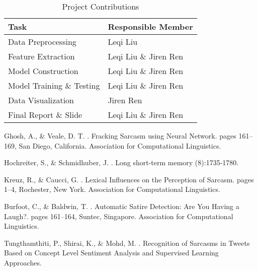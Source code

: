 \documentclass[11pt]{article}
\begin{document}
\begin{table}[ht]
\centering
\begin{tabular}{|l|l|}
\hline
\textbf{Task}              & \textbf{Responsible Member} \\ \hline
Data Preprocessing         & Leqi Liu                    \\ \hline
Feature Extraction         & Leqi Liu \& Jiren Ren       \\ \hline
Model Construction         & Leqi Liu \& Jiren Ren       \\ \hline
Model Training \& Testing  & Leqi Liu \& Jiren Ren       \\ \hline
Data Visualization         & Jiren Ren                   \\ \hline
Final Report \& Slide      & Leqi Liu \& Jiren Ren       \\ \hline
\end{tabular}
\caption{Project Contributions}
\end{table}


%
%

\begin{thebibliography}{}

Ghosh, A., \& Veale, D. T.
.
\newblock Fracking Sarcasm using Neural Network.
\newblock pages 161–169, San Diego, California. Association for Computational Linguistics.

Hochreiter, S., \& Schmidhuber, J.
.
\newblock Long short-term memory
(8):1735-1780.

Kreuz, R., \& Caucci, G.
.
\newblock Lexical Influences on the Perception of Sarcasm.
\newblock pages 1–4, Rochester, New York. Association for Computational Linguistics.

Burfoot, C., \& Baldwin, T.
.
\newblock Automatic Satire Detection: Are You Having a Laugh?.
\newblock pages 161–164, Suntec, Singapore. Association for Computational Linguistics.

Tungthamthiti, P., Shirai, K., \& Mohd, M.
.
\newblock Recognition of Sarcasms in Tweets Based on Concept Level Sentiment Analysis and Supervised Learning Approaches.

\end{thebibliography}
\end{document}
